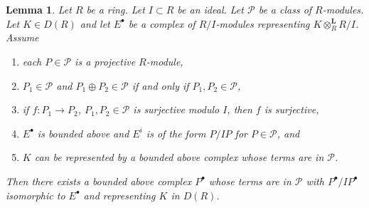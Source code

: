 \documentclass{amsart}
\theoremstyle{plain}
\newtheorem{lemma}[subsection]{Lemma}
\theoremstyle{definition}
\theoremstyle{remark}
\numberwithin{equation}{subsection}
\begin{document}
\begin{lemma}
\label{more-algebra-lemma-lift-complex}
Let $R$ be a ring. Let $I \subset R$ be an ideal. Let $\mathcal{P}$
be a class of $R$-modules.
Let $K \in D(R)$ and let $E^\bullet$ be a complex of $R/I$-modules
representing $K \otimes_R^\mathbf{L} R/I$. Assume
\begin{enumerate}
\item each $P \in \mathcal{P}$ is a projective $R$-module,
\item $P_1 \in \mathcal{P}$ and $P_1 \oplus P_2 \in \mathcal{P}$
if and only if $P_1, P_2 \in \mathcal{P}$,
\item if $f : P_1 \to P_2$, $P_1, P_2 \in \mathcal{P}$ is surjective
modulo $I$, then $f$ is surjective,
\item $E^\bullet$ is bounded above and $E^i$ is of the form $P/IP$
for $P \in \mathcal{P}$, and
\item $K$ can be represented by a bounded above complex
whose terms are in $\mathcal{P}$.
\end{enumerate}
Then there exists a bounded above complex $P^\bullet$ whose terms
are in $\mathcal{P}$ with $P^\bullet/IP^\bullet$ isomorphic to
$E^\bullet$ and representing $K$ in $D(R)$.
\end{lemma}
\end{document}
